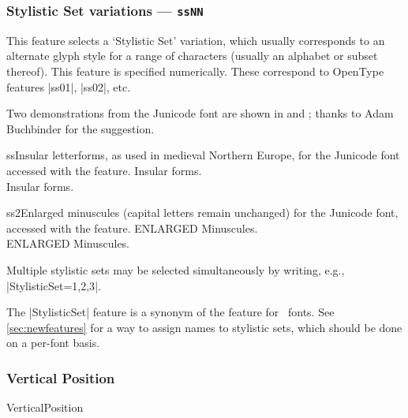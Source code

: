 \documentclass[a4paper]{l3doc}
\begin{document}
\subsubsection{Stylistic Set variations --- \texttt{ssNN}}
\label{sec:ot-ss}

This feature selects a `Stylistic Set' variation,
which usually corresponds to an alternate glyph style for a range of
characters (usually an alphabet or subset thereof).
This feature is specified numerically. These correspond to OpenType
features |ss01|, |ss02|, etc.

Two demonstrations from the Junicode
font
are shown in  and ; thanks to Adam
Buchbinder for the suggestion.

\begin{Lexample}{ss}{Insular letterforms, as used in medieval Northern Europe, for the Junicode font accessed with the  feature.}
   Insular forms. \\
   Insular forms. \\
\end{Lexample}

\begin{Lexample}{ss2}{Enlarged minuscules (capital letters remain unchanged) for the Junicode font, accessed with the  feature.}
   ENLARGED Minuscules. \\
   ENLARGED Minuscules. \\
\end{Lexample}

Multiple stylistic sets may be selected simultaneously by writing, e.g.,
|StylisticSet={1,2,3}|.

The |StylisticSet| feature is a synonym of the  feature for \AAT\ fonts.
See \vref{sec:newfeatures} for a way to assign names to stylistic sets, which should be done on a per-font basis.


\subsubsection{Vertical Position}

\begin{features}{VerticalPosition}
\end{features}
\end{document}
